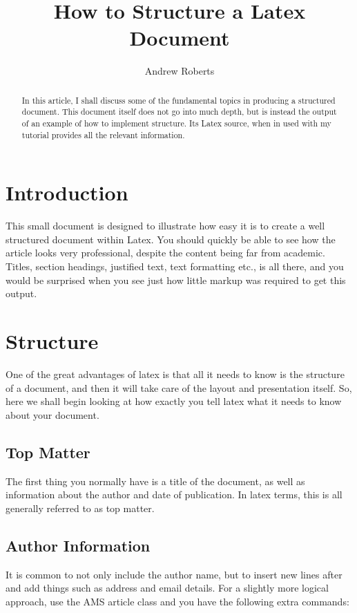 

	\title{How to Structure a Latex Document} 
	\author{Andrew Roberts}  

	\begin{abstract}
		In this article, I shall discuss some of the fundamental topics in
		producing a structured document.  This document itself does not go into
		much depth, but is instead the output of an example of how to implement
		structure. Its Latex source, when in used with my tutorial
		provides all the relevant information.  \end{abstract}
	
	\section{Introduction}
	This small document is designed to illustrate how easy it is to create a
	well structured document within Latex.  You should quickly be able to
	see how the article looks very professional, despite the content being
	far from academic.  Titles, section headings, justified text, text
	formatting etc., is all there, and you would be surprised when you see
	just how little markup was required to get this output.
	
	\section{Structure}
	One of the great advantages of latex is that all it needs to know is
	the structure of a document, and then it will take care of the layout
	and presentation itself.  So, here we shall begin looking at how exactly
	you tell latex what it needs to know about your document.
	
	\subsection{Top Matter}
	The first thing you normally have is a title of the document, as well as
	information about the author and date of publication. In latex terms,
	this is all generally referred to as top matter.
	
	\subsection{Author Information}

	It is common to not only include the author name, but to insert new
	lines after and add things such
	as address and email details.  For a slightly more logical approach, use
	the AMS article class and you have the following extra
	commands:
	
